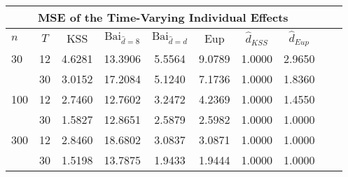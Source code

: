 \begin{tabular}{lccccccccc} 
\hline \multicolumn{8}{c}{MSE of the Time-Varying Individual Effects} \\ \hline 
$n$ & $T$ & KSS & $ \text{Bai}_{\hat{d} = 8}$ & $\text{Bai}_{\hat{d} = d}$ & Eup & $\hat{d}_{KSS}$ & $\hat{d}_{Eup}$ \\
\hline
30 & 12 &  4.6281  &  13.3906  &  5.5564  &  9.0789  &  1.0000  &  2.9650  \\
& 30 &  3.0152  &  17.2084  &  5.1240  &  7.1736  &  1.0000  &  1.8360  \\
100 & 12 &  2.7460  &  12.7602  &  3.2472  &  4.2369  &  1.0000  &  1.4550  \\
& 30 &  1.5827  &  12.8651  &  2.5879  &  2.5982  &  1.0000  &  1.0000  \\
300 & 12 &  2.8460  &  18.6802  &  3.0837  &  3.0871  &  1.0000  &  1.0000  \\
& 30 &  1.5198  &  13.7875  &  1.9433  &  1.9444  &  1.0000  &  1.0000  \\
\end{tabular} 
